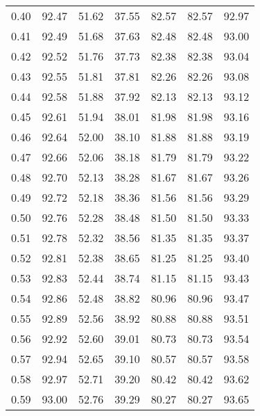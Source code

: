 \begin{tabular}{|c|c|c|c|c|c|c|}
      0.40 &     92.47 &     51.62 &      37.55 &   82.57 &      82.57 &         92.97 \\
      0.41 &     92.49 &     51.68 &      37.63 &   82.48 &      82.48 &         93.00 \\
      0.42 &     92.52 &     51.76 &      37.73 &   82.38 &      82.38 &         93.04 \\
      0.43 &     92.55 &     51.81 &      37.81 &   82.26 &      82.26 &         93.08 \\
      0.44 &     92.58 &     51.88 &      37.92 &   82.13 &      82.13 &         93.12 \\
      0.45 &     92.61 &     51.94 &      38.01 &   81.98 &      81.98 &         93.16 \\
      0.46 &     92.64 &     52.00 &      38.10 &   81.88 &      81.88 &         93.19 \\
      0.47 &     92.66 &     52.06 &      38.18 &   81.79 &      81.79 &         93.22 \\
      0.48 &     92.70 &     52.13 &      38.28 &   81.67 &      81.67 &         93.26 \\
      0.49 &     92.72 &     52.18 &      38.36 &   81.56 &      81.56 &         93.29 \\
      0.50 &     92.76 &     52.28 &      38.48 &   81.50 &      81.50 &         93.33 \\
      0.51 &     92.78 &     52.32 &      38.56 &   81.35 &      81.35 &         93.37 \\
      0.52 &     92.81 &     52.38 &      38.65 &   81.25 &      81.25 &         93.40 \\
      0.53 &     92.83 &     52.44 &      38.74 &   81.15 &      81.15 &         93.43 \\
      0.54 &     92.86 &     52.48 &      38.82 &   80.96 &      80.96 &         93.47 \\
      0.55 &     92.89 &     52.56 &      38.92 &   80.88 &      80.88 &         93.51 \\
      0.56 &     92.92 &     52.60 &      39.01 &   80.73 &      80.73 &         93.54 \\
      0.57 &     92.94 &     52.65 &      39.10 &   80.57 &      80.57 &         93.58 \\
      0.58 &     92.97 &     52.71 &      39.20 &   80.42 &      80.42 &         93.62 \\
      0.59 &     93.00 &     52.76 &      39.29 &   80.27 &      80.27 &         93.65 \\

\end{tabular}
